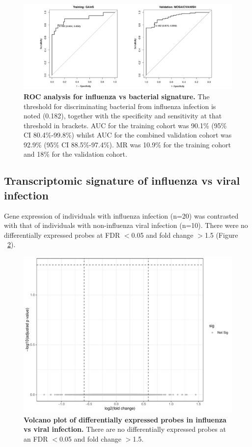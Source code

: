 \FloatBarrier
\begin{figure}[htbp]
\centering
\includegraphics[width=\textwidth]{./Results3/Images/roc-flu-both.png}
\caption[ROC analysis for influenza vs bacterial signature]{\textbf{ROC analysis for influenza vs bacterial signature.} The threshold for discriminating bacterial from influenza infection is noted (0.182), together with the specificity and sensitivity at that threshold in brackets. AUC for the training cohort was 90.1\% (95\% CI 80.4\%-99.8\%) whilst AUC for the combined validation cohort was 92.9\% (95\% CI 88.5\%-97.4\%). MR was 10.9\% for the training cohort and 18\% for the validation cohort.}
\label{fig:roc-flu}
\end{figure}
\FloatBarrier
 
\subsection{Transcriptomic signature of influenza vs viral infection}
Gene expression of individuals with influenza infection (n=20) was contrasted with that of individuals with non-influenza viral infection (n=10). There were no differentially expressed probes at FDR $<$0.05 and fold change $>$1.5 (Figure ~\ref{fig:vp-flu-viral}).

\FloatBarrier
\begin{figure}[htbp]
\centering
\includegraphics[width=\textwidth]{./Results3/Images/vp-flu-viral.pdf}
\caption[Volcano plot of differentially expressed probes in influenza vs viral infection]{\textbf{Volcano plot of differentially expressed probes in influenza vs viral infection.} There are no differentially expressed probes at an FDR $<$0.05 and fold change $>$1.5.}
\label{fig:vp-flu-viral}
\end{figure}
\FloatBarrier

